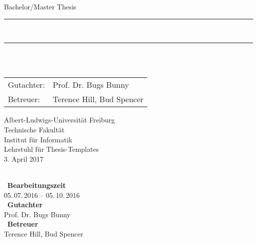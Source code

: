 \begin{titlepage}
\begin{center}

\newcommand{\HorizontalLine}{\rule{\linewidth}{0.3mm}}

{\Large Bachelor/Master Thesis}\\[1.3cm]


\HorizontalLine \\[0.4cm]
{ \huge \bfseries \thetitle }
\HorizontalLine \\[1.5cm]


{\Huge \theauthor} \\[2cm]


\begin{tabular}[hc]{>{\huge}l >{\huge}l}
  Gutachter: & Prof. Dr. Bugs Bunny \\[0.3cm]
  Betreuer: & Terence Hill, Bud Spencer \\[1.2cm]
\end{tabular}
\vfill  %

\Large {
    Albert-Ludwigs-Universität Freiburg\\
    Technische Fakultät\\
    Institut für Informatik\\
    Lehrstuhl für Thesis-Templates\\[1cm]

    3. April 2017
    \\
}
\end{center}
\end{titlepage}

\thispagestyle{empty}
\ \vfill \ \\  %
\
\textbf{Bearbeitungszeit}            \smallskip{} \\
05.\,07.\,2016 -- 05.\,10.\,2016   \bigskip{} \\
\
\textbf{Gutachter}                  \smallskip{} \\
Prof. Dr. Bugs Bunny               \bigskip{} \\
\
\textbf{Betreuer}                  \smallskip{} \\
Terence Hill, Bud Spencer
